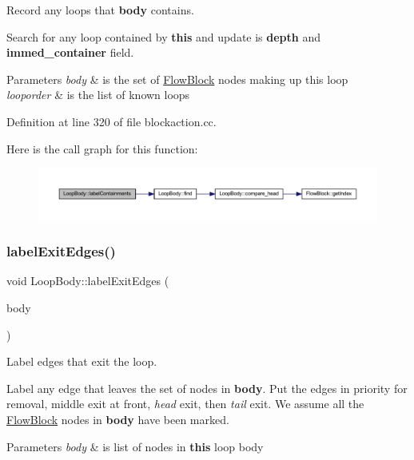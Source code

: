 Record any loops that {\bfseries{body}} contains. 

Search for any loop contained by {\bfseries{this}} and update is {\bfseries{depth}} and {\bfseries{immed\+\_\+container}} field. 
\begin{DoxyParams}{Parameters}
{\em body} & is the set of \mbox{\hyperlink{class_flow_block}{Flow\+Block}} nodes making up this loop \\
\hline
{\em looporder} & is the list of known loops \\
\hline
\end{DoxyParams}


Definition at line 320 of file blockaction.\+cc.

Here is the call graph for this function\+:
\nopagebreak
\begin{figure}[H]
\begin{center}
\leavevmode
\includegraphics[width=350pt]{class_loop_body_a86b8806010db2bfe0fc11b41e906278a_cgraph}
\end{center}
\end{figure}
\mbox{\label{class_loop_body_a7c3db3d0244209f2a200998b9a1b01cb}} 
\subsubsection{\texorpdfstring{labelExitEdges()}{labelExitEdges()}}
{\footnotesize\ttfamily void Loop\+Body\+::label\+Exit\+Edges (\begin{DoxyParamCaption}\item[{const vector$<$ \mbox{\hyperlink{class_flow_block}{Flow\+Block}} $\ast$ $>$ \&}]{body }\end{DoxyParamCaption})}



Label edges that exit the loop. 

Label any edge that leaves the set of nodes in {\bfseries{body}}. Put the edges in priority for removal, middle exit at front, {\itshape head} exit, then {\itshape tail} exit. We assume all the \mbox{\hyperlink{class_flow_block}{Flow\+Block}} nodes in {\bfseries{body}} have been marked. 
\begin{DoxyParams}{Parameters}
{\em body} & is list of nodes in {\bfseries{this}} loop body \\
\hline
\end{DoxyParams}


